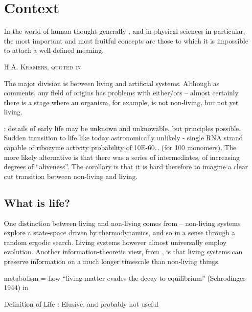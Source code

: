 \chapter{Context}\label{context}

\epigraph{%
In the world of human thought generally , and in physical sciences in particular, the most important and most fruitful concepts are those to which it is impossible to attach a well-defined meaning.}%
{\textsc{H.A. Kramers, quoted in \autocite{Bruylants2010}}}

The major division is between living and artificial systems. Although as \autocite{Bruylants2010} comments, any field of origins has problems with
either/ors -- almost certainly there is a stage where an organism, for example, is not non-living, but not yet living.

 \autocite{Pascal2013}: details of early life may be unknown and unknowable, but principles possible. Sudden transition to life like today astronomically unlikely - single RNA strand capable of ribozyme activity probability of 10E-60\ldots{} (for 100 monomers). The more likely alternative is that there was a series of intermediates, of increasing degrees of ``aliveness''. The corollary is that it is hard therefore to imagine a clear cut transition between non-living and living.

\section{What is life?}\label{what-is-life}

One distinction between living and non-living comes from \autocite{Rasmussen2004} -- non-living systems explore a state-space driven by thermodynamics, and so in a sense through a random ergodic search. Living systems however almost universally employ evolution. Another information-theoretic view, from \autocite{Adami2015}, is that living systems can preserve information on a much longer timescale than non-living things.

			metabolism = how ``living matter evades the decay to equilibrium''
			(Schrodinger 1944) in \autocite{Pascal2013}

			Definition of Life  \autocite{Pascal2013}: Elusive, and probably not useful
			
